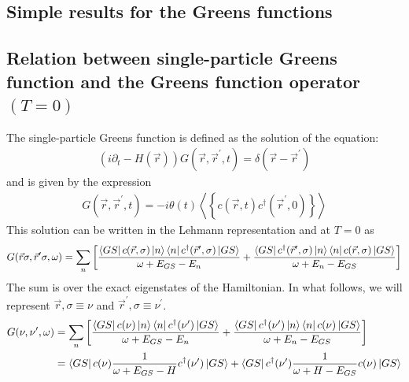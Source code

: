 \documentclass{report}
\numberwithin{equation}{section}
\begin{document}
\begin{appendices}
\chapter{Simple results for the Greens functions}
\section*{Relation between single-particle Greens function and the Greens function operator $(T=0)$}
 The single-particle Greens function is defined as the solution of the equation:
 \begin{equation}\begin{aligned}
	 \left(i\partial_t - H(\vec r)\right)G(\vec r,\vec r^\prime, t) = \delta(\vec r - \vec r^\prime)
 \end{aligned}\end{equation}
 and is given by the expression
 \begin{equation}\begin{aligned}
	 G(\vec r,\vec r^\prime, t) = -i \theta(t) \left< \left\{ c(\vec r, t) c^\dagger(\vec r^\prime, 0)\right\} \right>
 \end{aligned}\end{equation}
 This solution can be written in the Lehmann representation  and at $T=0$ as
 \begin{equation}\begin{aligned}
	 G(\vec r \sigma, \vec r^\prime \sigma, \omega) = \sum_{n}\left[\frac{\bra{GS}c({\vec r,\sigma})\ket{n}\bra{n}c^\dagger(\vec r^\prime,\sigma)\ket{GS}}{\omega + E_{GS} - E_n} + \frac{\bra{GS}c^\dagger(\vec r^\prime,\sigma)\ket{n}\bra{n}c({\vec r,\sigma})\ket{GS}}{\omega + E_n - E_{GS}}\right]
 \end{aligned}\end{equation}
 The sum is over the exact eigenstates of the Hamiltonian. In what follows, we will represent $\vec r,\sigma \equiv \nu$ and $\vec r^\prime,\sigma \equiv \nu^\prime$.
 \begin{equation}\begin{aligned}
	 G(\nu, \nu^\prime, \omega) &= \sum_{n}\left[\frac{\bra{GS}c(\nu)\ket{n}\bra{n}c^\dagger(\nu^\prime)\ket{GS}}{\omega + E_{GS} - E_n} + \frac{\bra{GS}c^\dagger(\nu^\prime)\ket{n}\bra{n}c(\nu)\ket{GS}}{\omega + E_n - E_{GS}}\right]\\
							&= \bra{GS}c(\nu)\frac{1}{\omega + E_{GS} - H}c^\dagger(\nu^\prime)\ket{GS} + \bra{GS}c^\dagger(\nu^\prime)\frac{1}{\omega + H - E_{GS}}c(\nu)\ket{GS}\\
 \end{aligned}\end{equation}

\end{appendices}
\end{document}
